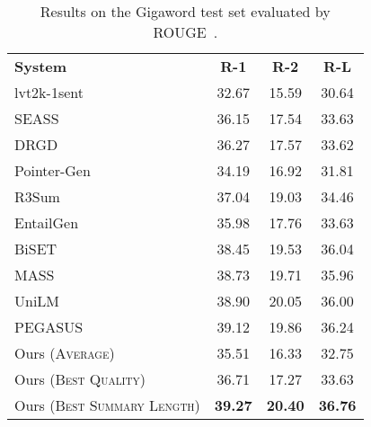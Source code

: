 \documentclass[11pt]{article}
\begin{document}
\begin{table}[t]
\centering
\setlength{\tabcolsep}{5pt}
\renewcommand{\arraystretch}{1.2}
\begin{fontpbk}
\begin{scriptsize}
\begin{tabular}{|l|ccc|}
\hline
\textbf{System} & \textbf{R-1} & \textbf{R-2} & \textbf{R-L}\\
\hdashline
lvt2k-1sent {\scriptsize\cite{nallapati-etal-2016}} & 32.67 & 15.59 & 30.64 \\
SEASS {\scriptsize\cite{zhou-etal-2017-selective}} & 36.15 & 17.54 & 33.63 \\
DRGD {\scriptsize\cite{li-etal-2017-deep}} & 36.27 & 17.57 & 33.62 \\
Pointer-Gen {\scriptsize\cite{see-etal-2017-get}} & 34.19 & 16.92 & 31.81\\
R3Sum {\scriptsize\cite{cao-etal-2018-retrieve}} & 37.04 & 19.03 & 34.46 \\
EntailGen {\scriptsize\cite{guo-etal-2018-soft}} & 35.98 & 17.76 & 33.63\\
BiSET {\scriptsize\cite{wang-etal-2019-biset}} & 38.45 & 19.53 & 36.04 \\
MASS {\scriptsize\cite{song2019mass}} & 38.73 & 19.71 & 35.96\\
UniLM {\scriptsize\cite{NIPS2019_9464}} & 38.90 & 20.05 & 36.00\\
PEGASUS {\scriptsize\cite{zhang2020pegasus}} & 39.12 & 19.86 & 36.24\\
\hdashline
Ours (\textsc{Average}) & 35.51 & 16.33 & 32.75\\
Ours (\textsc{Best Quality}) & 36.71 & 17.27 & 33.63\\
Ours (\textsc{Best Summary Length}) & \textbf{39.27} & \textbf{20.40} & \textbf{36.76}\\
\hline
\end{tabular}
\end{scriptsize}
\end{fontpbk}
\caption[Caption for LOF]{
Results on the Gigaword test set evaluated by ROUGE~\cite{lin-2004-rouge}.\protect\footnotemark
}
\label{tab:results_gigaword}
\vspace{-0.1in}
\end{table}
\end{document}
